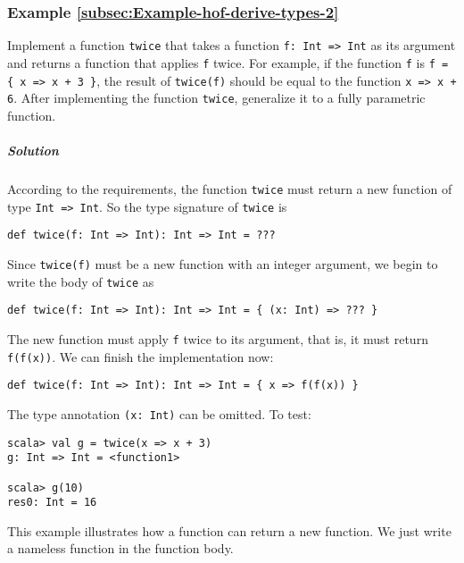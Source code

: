 \subsubsection{Example \label{subsec:Example-hof-derive-types-2}\ref{subsec:Example-hof-derive-types-2}}

Implement a function \lstinline!twice! that takes a function \lstinline!f: Int => Int!
as its argument and returns a function that applies \lstinline!f!
twice. For example, if the function \lstinline!f! is \lstinline!f = { x => x + 3 }!,
the result of \lstinline!twice(f)! should be equal to the function
\lstinline!x => x + 6!. After implementing the function \lstinline!twice!,
generalize it to a fully parametric function.

\subparagraph{Solution}

According to the requirements, the function \lstinline!twice! must
return a new function of type \lstinline!Int => Int!. So the type
signature of \lstinline!twice! is
\begin{lstlisting}
def twice(f: Int => Int): Int => Int = ???
\end{lstlisting}
Since \lstinline!twice(f)! must be a new function with an integer
argument, we begin to write the body of \lstinline!twice! as
\begin{lstlisting}
def twice(f: Int => Int): Int => Int = { (x: Int) => ??? }
\end{lstlisting}
The new function must apply \lstinline!f! twice to its argument,
that is, it must return \lstinline!f(f(x))!. We can finish the implementation
now:
\begin{lstlisting}
def twice(f: Int => Int): Int => Int = { x => f(f(x)) }
\end{lstlisting}
The type annotation \lstinline!(x: Int)! can be omitted. To test:
\begin{lstlisting}
scala> val g = twice(x => x + 3)
g: Int => Int = <function1>

scala> g(10)
res0: Int = 16
\end{lstlisting}

This example illustrates how a function can return a new function.
We just write a nameless function in the function body.

